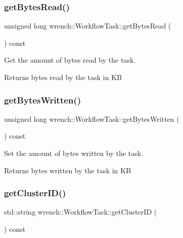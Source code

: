 \subsubsection{\texorpdfstring{get\+Bytes\+Read()}{getBytesRead()}}
{\footnotesize\ttfamily unsigned long wrench\+::\+Workflow\+Task\+::get\+Bytes\+Read (\begin{DoxyParamCaption}{ }\end{DoxyParamCaption}) const}



Get the amount of bytes read by the task. 

\begin{DoxyReturn}{Returns}
bytes read by the task in KB 
\end{DoxyReturn}
\mbox{\label{classwrench_1_1_workflow_task_afe222b599fa4ba072aa6162d9c8287ab}} 
\subsubsection{\texorpdfstring{get\+Bytes\+Written()}{getBytesWritten()}}
{\footnotesize\ttfamily unsigned long wrench\+::\+Workflow\+Task\+::get\+Bytes\+Written (\begin{DoxyParamCaption}{ }\end{DoxyParamCaption}) const}



Set the amount of bytes written by the task. 

\begin{DoxyReturn}{Returns}
bytes written by the task in KB 
\end{DoxyReturn}
\mbox{\label{classwrench_1_1_workflow_task_a46ed2cbccf91f55c73fb99900a953d60}} 
\subsubsection{\texorpdfstring{get\+Cluster\+I\+D()}{getClusterID()}}
{\footnotesize\ttfamily std\+::string wrench\+::\+Workflow\+Task\+::get\+Cluster\+ID (\begin{DoxyParamCaption}{ }\end{DoxyParamCaption}) const}



